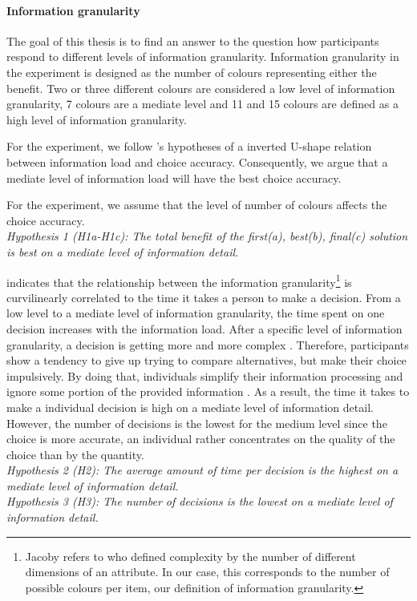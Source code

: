 \paragraph{Information granularity}
The goal of this thesis is to find an answer to the question how participants respond to different levels of information granularity.
Information granularity in the experiment is designed as the number of colours representing either the benefit.  Two or three different colours are considered a low level of information granularity, 7 colours are a mediate level and 11 and 15 colours are defined as a high level of information granularity.

For the experiment, we follow \cite{Jacoby1974}'s hypotheses of a inverted U-shape relation between information load and choice accuracy. Consequently, we argue that a mediate level of information load will have the best choice accuracy.

For the experiment, we assume that the level of number of colours affects the choice accuracy.\\
\textit{Hypothesis 1 (H1a-H1c): The total benefit of the first(a), best(b), final(c) solution is best on a mediate level of information detail.}

\cite{Jacoby1974} indicates that the relationship between the information granularity\footnote{Jacoby refers to \cite{Hendrick1968} who defined complexity by the number of different dimensions of an attribute. In our case, this corresponds to the number of possible colours per item, our definition of information granularity. }  is curvilinearly correlated to the time it takes a person to make a decision. From a low level to a mediate level of information granularity, the time spent on one decision increases with the information load. After a specific level of information granularity, a decision is getting more and more complex \citep{Hendrick1968}. Therefore, participants show a tendency to give up trying to compare alternatives, but make their choice impulsively. By doing that, individuals simplify their information processing and ignore some portion of the provided information \citep{Malhotra1982}.
As a result, the time it takes to make a individual decision is high on a mediate level of information detail. However, the number of decisions is the lowest for the medium level since the choice is more accurate, an individual rather concentrates on the quality of the choice than by the quantity.\\ 
\textit{Hypothesis 2 (H2): The average amount of time per decision is the highest on a mediate level of information detail.}\\
\textit{Hypothesis 3 (H3): The number of decisions is the lowest on a mediate level of information detail.}\\


